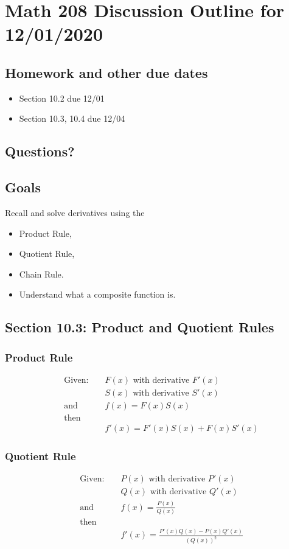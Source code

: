 \documentclass[14pt]{extarticle}
\begin{document}
\section*{Math 208 Discussion Outline for 12/01/2020}


\subsection{Homework and other due dates}
\begin{itemize}
\item Section 10.2 due 12/01
\item Section 10.3, 10.4 due 12/04
\end{itemize}

\subsection{Questions?}

\subsection{Goals}
Recall and solve derivatives using the
\begin{itemize}
	\item Product Rule,
	\item Quotient Rule,
	\item Chain Rule.
	\item Understand what a composite function is.
\end{itemize}

\subsection{Section 10.3: Product and Quotient Rules}
\subsubsection*{Product Rule}
\begin{align*}
	&\text{Given: } & &F(x) \text{ with derivative } F'(x) \\
	& & &S(x) \text{ with derivative } S'(x) \\
	&\text{and } & &f(x) = F(x)S(x) \\
	&\text{then }\\
	& & &f'(x) = F'(x)S(x) + F(x)S'(x)
\end{align*}
\subsubsection*{Quotient Rule}
\begin{align*}
	&\text{Given: } & &P(x) \text{ with derivative } P'(x) \\
	& & &Q(x) \text{ with derivative } Q'(x) \\
	&\text{and } & &f(x) = \frac{P(x)}{Q(x)} \\
	&\text{then }\\
	& & &f'(x) = \frac{P'(x)Q(x) - P(x)Q'(x)}{(Q(x))^2}
\end{align*}
\end{document}
